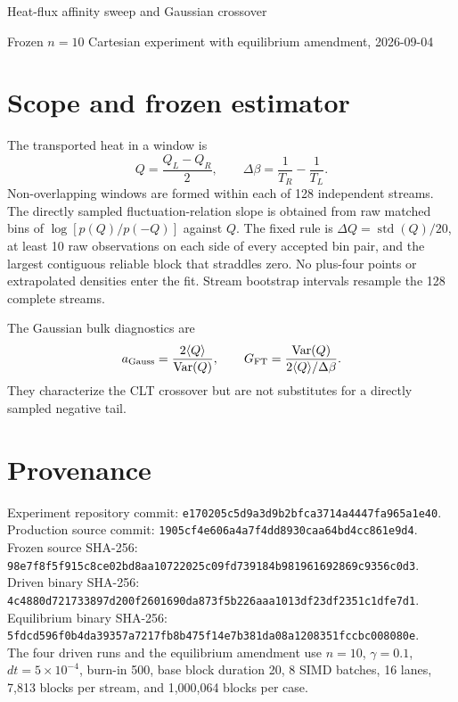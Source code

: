 \documentclass[10pt]{article}
\begin{document}
\begin{center}
{\Large Heat-flux affinity sweep and Gaussian crossover}\par
\vspace{0.3em}
{\small Frozen $n=10$ Cartesian experiment with equilibrium amendment, 2026-09-04}
\end{center}

\section*{Scope and frozen estimator}
The transported heat in a window is
\[
Q=\frac{Q_L-Q_R}{2},\qquad
\Delta\beta=\frac{1}{T_R}-\frac{1}{T_L}.
\]
Non-overlapping windows are formed within each of 128 independent streams.
The directly sampled fluctuation-relation slope is obtained from raw matched
bins of $\log[p(Q)/p(-Q)]$ against $Q$.  The fixed rule is
$\Delta Q=\operatorname{std}(Q)/20$, at least 10 raw observations on each
side of every accepted bin pair, and the largest contiguous reliable block
that straddles zero.  No plus-four points or extrapolated densities enter the
fit.  Stream bootstrap intervals resample the 128 complete streams.

The Gaussian bulk diagnostics are
\[
a_{\rm Gauss}=\frac{2\langle Q\rangle}{\operatorname{Var}(Q)},\qquad
G_{\rm FT}=\frac{\operatorname{Var}(Q)}{2\langle Q\rangle/\Delta\beta}.
\]
They characterize the CLT crossover but are not substitutes for a directly
sampled negative tail.

\section*{Provenance}
Experiment repository commit: \nolinkurl{e170205c5d9a3d9b2bfca3714a4447fa965a1e40}.\\
Production source commit: \nolinkurl{1905cf4e606a4a7f4dd8930caa64bd4cc861e9d4}.\\
Frozen source SHA-256: \nolinkurl{98e7f8f5f915c8ce02bd8aa10722025c09fd739184b981961692869c9356c0d3}.\\
Driven binary SHA-256: \nolinkurl{4c4880d721733897d200f2601690da873f5b226aaa1013df23df2351c1dfe7d1}.\\
Equilibrium binary SHA-256: \nolinkurl{5fdcd596f0b4da39357a7217fb8b475f14e7b381da08a1208351fccbc008080e}.\\

The four driven runs and the equilibrium amendment use $n=10$, $\gamma=0.1$, $dt=5\times10^{-4}$, burn-in 500, base block duration 20, 8 SIMD batches, 16 lanes, 7,813 blocks per stream, and 1,000,064 blocks per case.
\end{document}
